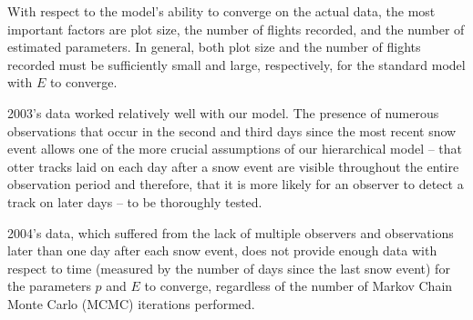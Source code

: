 \documentclass{article}
\begin{document}
    With respect to the model's ability to converge on the actual data, the most
    important factors are plot size, the number of flights recorded, and the
    number of estimated parameters.  In general, both plot size and the number
    of flights recorded must be sufficiently small and large, respectively, for
    the standard model with \(E\) to converge.  

    2003's data worked relatively well with our model.  The presence of numerous
    observations that occur in the second and third days since the most recent
    snow event allows one of the more crucial assumptions of our hierarchical
    model -- that otter tracks laid on each day after a snow event are visible
    throughout the entire observation period and therefore, that it is more
    likely for an observer to detect a track on later days -- to be thoroughly
    tested.

    2004's data, which suffered from the lack of multiple observers and
    observations later than one day after each snow event, does not provide
    enough data with respect to time (measured by the number of days since the
    last snow event) for the parameters \(p\) and \(E\) to converge, regardless
    of the number of Markov Chain Monte Carlo (MCMC) iterations performed.
\end{document}
